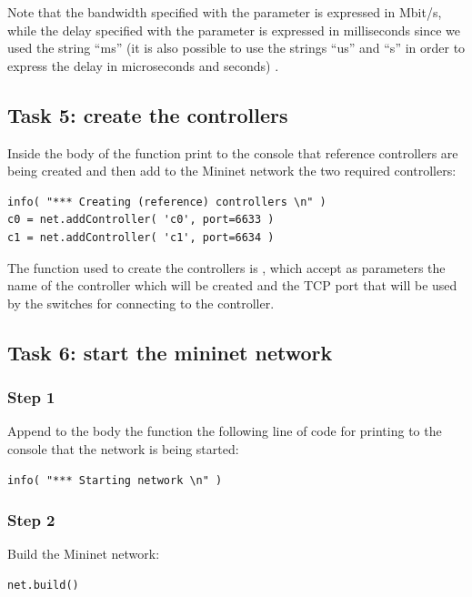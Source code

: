 Note that the bandwidth specified with the parameter  is expressed in
Mbit/s, while the delay specified with the parameter  is expressed
in milliseconds since we used the string ``ms'' (it is also possible to use
the strings ``us'' and ``s'' in order to express the delay in microseconds and
seconds) \cite{ref-7}.





\subsection*{Task 5: create the controllers}
Inside the body of the function  print to the console
that reference controllers are being created and then add to the Mininet network
the two required controllers:
\begin{lstlisting}
info( "*** Creating (reference) controllers \n" )
c0 = net.addController( 'c0', port=6633 )
c1 = net.addController( 'c1', port=6634 )
\end{lstlisting}

The function used to create the controllers is , which accept
as parameters the name of the controller which will be created and the TCP port that
will be used by the switches for connecting to the controller.







\subsection*{Task 6: start the mininet network}
\subsubsection*{Step 1}
Append to the body the function  the following line
of code for printing to the console that the network is being started:
\begin{lstlisting}
info( "*** Starting network \n" )
\end{lstlisting}

\subsubsection*{Step 2}
Build the Mininet network:
\begin{lstlisting}
net.build()
\end{lstlisting}

